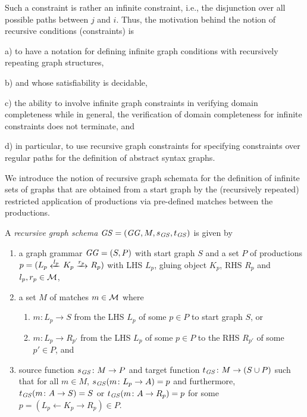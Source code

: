 Such a constraint is rather an infinite constraint, i.e., the disjunction over all possible paths between $j$ and $i$. 
Thus, the motivation behind the notion of recursive conditions (constraints) is
\begin{enumerate*}
\item[a)] to have a notation for defining infinite graph conditions with recursively repeating graph structures,
\item[b)] and whose satisfiability is decidable,
\item[c)] the ability to involve infinite graph constraints in verifying domain completeness while in general, the verification of domain completeness for infinite constraints does not terminate, and
\item[d)] in particular, to use recursive graph constraints for specifying constraints over regular paths for the definition of abstract syntax graphs.
\end{enumerate*}
We introduce the notion of recursive graph schemata for the definition of infinite sets of graphs that are obtained from a start graph by the (recursively repeated) restricted application of productions via pre-defined matches between the productions.
 
\begin{definition}
\label{def:sec-compl-software-trans:rec_cond}
A \emph{recursive graph schema} $\mathit{GS}=(\mathit{GG},M,s_\mathit{GS},t_\mathit{GS})$ is given by
\begin{enumerate}
  \item a graph grammar $\mathit{GG}=(S,P)$ with start graph $S$ and a set $P$ of productions $p=(L_p \transB{l_p} K_p \trans{r_p} R_p)$ with LHS $L_p$, gluing object $K_p$, RHS $R_p$ and $l_p,r_p \in {\cal M}$,
  \item a set $M$ of matches $m \in {\cal M}$ where
  \begin{enumerate}
    \item $m\colon L_p \to S$ from the LHS $L_p$ of some $p \in P$ to start graph $S$, or
    \item $m\colon L_p \to R_{p'}$ from the LHS $L_p$ of some $p \in P$ to the RHS $R_{p'}$ of some $p' \in P$, and
  \end{enumerate}
  \item source function $s_\mathit{GS}\colon M \to P$ and target function $t_\mathit{GS}\colon M \to (S \cup P)$ such that for all $m \in M$, $s_\mathit{GS}(m\colon L_p \to A)=p$ and furthermore, $t_\mathit{GS}(m\colon A \to S)=S$ or $t_\mathit{GS}(m\colon A \to R_p)=p$ for some $p=(L_p \gets K_p \to R_p) \in P$.\envEndMarker
\end{enumerate} 
\end{definition}

